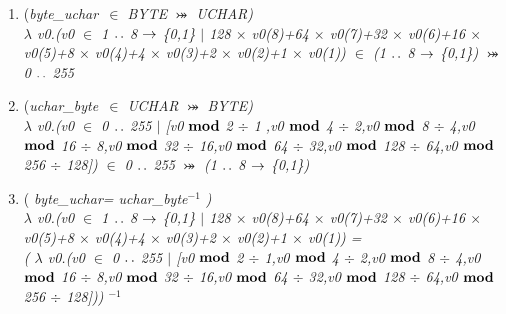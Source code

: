 \begin{enumerate}

\item (\it byte\_uchar\rm \ $\in$ \textit{BYTE} $\bij$ \textit{UCHAR})\\ 
 $\lambda$ \it v0\rm .\rm (\it v0 $\in$  \rm 1 $\upto$ \rm 8  $\fun$  \rm \{\rm 0\rm ,\rm 1\rm \}  $\mid$  \rm 1\rm 2\rm 8 $\times$ \it v0\rm (\rm 8\rm )\rm +\rm 6\rm 4 $\times$ \it v0\rm (\rm 7\rm )\rm +\rm 3\rm 2 $\times$ \it v0\rm (\rm 6\rm )\rm +\rm 1\rm 6 $\times$ \it v0\rm (\rm 5\rm )\rm +\rm 8 $\times$ \it v0\rm (\rm 4\rm )\rm +\rm 4 $\times$ \it v0\rm (\rm 3\rm )\rm +\rm 2 $\times$ \it v0\rm (\rm 2\rm )\rm +\rm 1 $\times$ \it v0\rm (\rm 1\rm )\rm ) \rm $\in$ \rm (\rm 1 $\upto$ \rm 8  $\fun$  \rm \{\rm 0\rm ,\rm 1\rm \}\rm )  $\bij$  \rm 0 $\upto$ \rm 2\rm 5\rm 5 \\

\item (\it uchar\_byte\rm \ $\in$ \textit{UCHAR} $\bij$ \textit{BYTE})\\ 
$\lambda$ \it v0\rm .\rm (\it v0 $\in$  \rm 0 $\upto$ \rm 2\rm 5\rm 5  $\mid$  \rm \rm  [\it v0  $\mod$  \rm 2 $\div$ 1 ,\it v0  $\mod$  \rm 4 $\div$ \rm 2\rm ,\it v0  $\mod$  \rm 8 $\div$ \rm 4\rm ,\it v0  $\mod$  \rm 1\rm 6 $\div$ \rm 8\rm ,\it v0  $\mod$  \rm 3\rm 2 $\div$ \rm 1\rm 6\rm ,\it v0  $\mod$  \rm 6\rm 4 $\div$ \rm 3\rm 2\rm ,\it v0  $\mod$  \rm 1\rm 2\rm 8 $\div$ \rm 6\rm 4\rm ,\it v0  $\mod$  \rm 2\rm 5\rm 6 $\div$ \rm 1\rm 2\rm 8\rm \rm ]\rm ) \rm   $\in$  \rm 0 $\upto$ \rm 2\rm 5\rm 5   $\bij$ \rm (\rm 1 $\upto$ \rm 8  $\fun$  \rm \{\rm 0\rm ,\rm 1\rm \}\rm )\\


\item  (   \it byte\_uchar\rm  =  \it uchar\_byte\rm$^{-1}$ )\\ 
  $\lambda$ \it v0\rm .\rm (\it v0 $\in$  \rm 1 $\upto$ \rm 8  $\fun$  \rm \{\rm 0\rm ,\rm 1\rm \}  $\mid$  \rm 1\rm 2\rm 8 $\times$ \it v0\rm (\rm 8\rm )\rm +\rm 6\rm 4 $\times$ \it v0\rm (\rm 7\rm )\rm +\rm 3\rm 2 $\times$ \it v0\rm (\rm 6\rm )\rm +\rm 1\rm 6 $\times$ \it v0\rm (\rm 5\rm )\rm +\rm 8 $\times$ \it v0\rm (\rm 4\rm )\rm +\rm 4 $\times$ \it v0\rm (\rm 3\rm )\rm +\rm 2 $\times$ \it v0\rm (\rm 2\rm )\rm +\rm 1 $\times$ \it v0\rm (\rm 1\rm )\rm ) \rm = \\
\rm ( $\lambda$ \it v0\rm .\rm (\it v0 $\in$  \rm 0 $\upto$ \rm 2\rm 5\rm 5  $\mid$  \rm \rm [\it v0  $\mod$  \rm 2 $\div$ \rm 1\rm ,\it v0  $\mod$  \rm 4 $\div$ \rm 2\rm ,\it v0  $\mod$  \rm 8 $\div$ \rm 4\rm ,\it v0  $\mod$  \rm 1\rm 6 $\div$ \rm 8\rm ,\it v0  $\mod$  \rm 3\rm 2 $\div$ \rm 1\rm 6\rm ,\it v0  $\mod$  \rm 6\rm 4 $\div$ \rm 3\rm 2\rm ,\it v0  $\mod$  \rm 1\rm 2\rm 8 $\div$ \rm 6\rm 4\rm ,\it v0  $\mod$  \rm 2\rm 5\rm 6 $\div$ \rm 1\rm 2\rm 8\rm \rm ]\rm )\rm ) $^{-1}$  \\

\end{enumerate}

